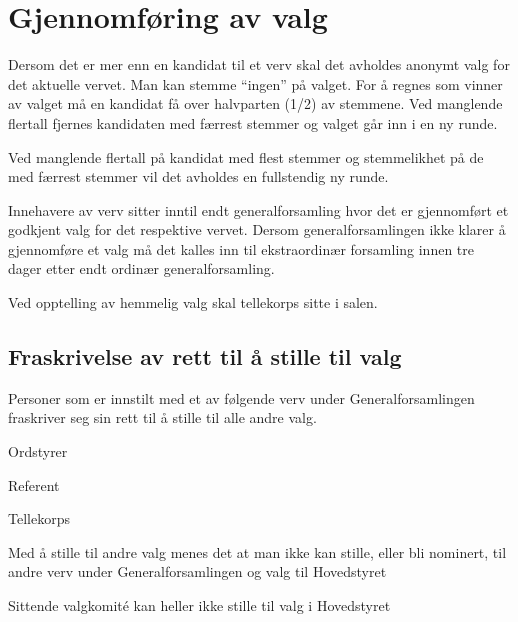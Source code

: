 \section{Gjennomføring av valg}{
\vspace{23pt}
Dersom det er mer enn en kandidat til et verv skal det avholdes anonymt valg for det aktuelle vervet. Man kan stemme “ingen” på valget. For å regnes som vinner av valget må en kandidat få over halvparten (1/2) av stemmene. Ved manglende flertall fjernes kandidaten med færrest stemmer og valget går inn i en ny runde.\newline
					
Ved manglende flertall på kandidat med flest stemmer og stemmelikhet på de med færrest stemmer vil det avholdes en fullstendig ny runde.\newline

Innehavere av verv sitter inntil endt generalforsamling hvor det er gjennomført et godkjent valg for det respektive vervet. Dersom generalforsamlingen ikke klarer å gjennomføre et valg må det kalles inn til ekstraordinær forsamling innen tre dager etter endt ordinær generalforsamling.\newline

Ved opptelling av hemmelig valg skal tellekorps sitte i salen.


	\subsection{Fraskrivelse av rett til å stille til valg} {
	Personer som er innstilt med et av følgende verv under Generalforsamlingen fraskriver seg sin rett til å stille til alle andre valg.
	\begin{liste}
		\item Ordstyrer
		\item Referent
		\item Tellekorps
	\end{liste}
	Med å stille til andre valg menes det at man ikke kan stille, eller bli nominert, til andre verv under Generalforsamlingen og valg til Hovedstyret \newline

    Sittende valgkomité kan heller ikke stille til valg i Hovedstyret

	}
}
